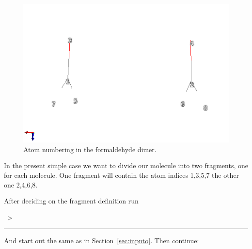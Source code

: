 \documentclass[DIV=12,headings=normal]{scrartcl}
\newcommand\Cline[2][red]{{\sbox\MBox{#2}%
  \rlap{\usebox\MBox}\color{#1}\rule[-1.2\dp\MBox]{\wd\MBox}{0.5pt}}}
\newcommand{\redl}[1]{\Cline{\textcolor{red}{#1}}}
\newcommand{\comm}[1]{
\small
~> \redl{#1}
\normalsize
}
\newcounter{number}
\begin{document}
\begin{figure}[h]
\begin{center}
\includegraphics[trim=1cm 2cm 1cm 2cm, clip=true, scale=1]{fa2/fa2avo.png}
\caption{Atom numbering in the formaldehyde dimer.}
\label{fig:fanrs}
\end{center}
\end{figure}

In the present simple case we want to divide our molecule into two fragments, one for each molecule.
One fragment will contain the atom indices 1,3,5,7 the other one 2,4,6,8.

After deciding on the fragment definition run 

\comm{theoinp}

And start out the same as in Section~\ref{sec:inpnto}. Then continue:
\end{document}
